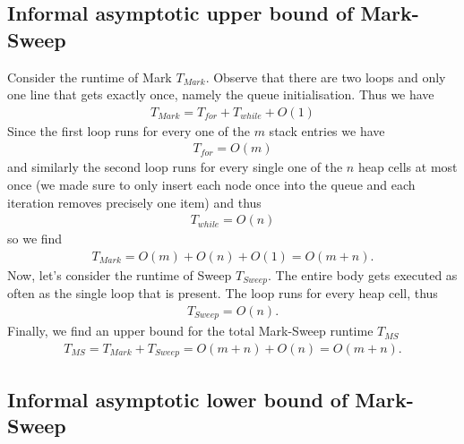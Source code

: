 \documentclass{article}
\begin{document}
\subsection{Informal asymptotic upper bound of Mark-Sweep}

Consider the runtime of Mark $T_{Mark}$. Observe that there are two loops
and only one line that gets exactly once, namely the queue initialisation.
Thus we have
\begin{align*}
    T_{Mark} = T_{for} + T_{while} + O(1)
\end{align*}
Since the first loop runs for every one of the $m$ stack entries we have
\begin{align*}
    T_{for} = O(m)
\end{align*}
and similarly the second loop runs for every single one of the $n$ heap cells at most once
(we made sure to only insert each node once into the queue and each iteration
removes precisely one item) and thus
\begin{align*}
    T_{while} = O(n)
\end{align*}
so we find 
\begin{align*}
    T_{Mark} = O(m) + O(n) + O(1) = O(m + n).
\end{align*}
Now, let's consider the runtime of Sweep $T_{Sweep}$. The entire body gets
executed as often as the single loop that is present. The loop runs for every
heap cell, thus 
\begin{align*}
    T_{Sweep} = O(n).
\end{align*}
Finally, we find an upper bound for the total Mark-Sweep runtime $T_{MS}$
\begin{align}
    \label{infhims}
    T_{MS} = T_{Mark} + T_{Sweep} = O(m+n) + O(n) = O(m + n).
\end{align}

\subsection{Informal asymptotic lower bound of Mark-Sweep}
\end{document}
